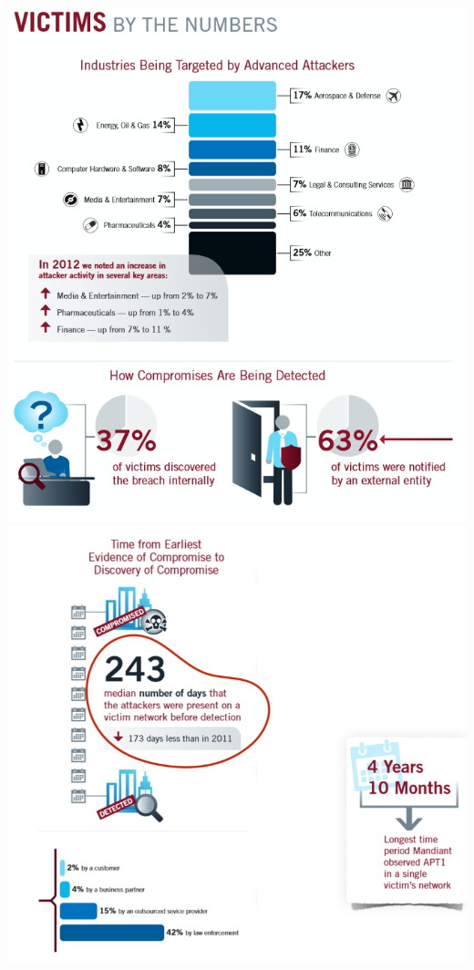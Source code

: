 \documentclass[10pt,a4paper]{article}
\begin{document}
\includegraphics[scale=0.55]{2_numbers.png}\\

\includegraphics[scale=0.55]{3_numbers.png}
\end{document}
